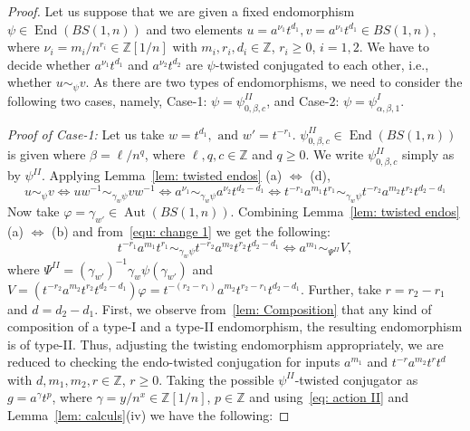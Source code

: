 \documentclass[a4paper]{amsart}
\theoremstyle{definition}
\newcommand\ZZ{\mathbb{Z}}
\newcommand{\Aut}{\operatorname{Aut}}
\newcommand{\End}{\operatorname{End}}
\begin{document}
\begin{proof}
    Let us suppose that we are given a fixed endomorphism $\psi \in \End (BS(1,n))$ and two elements $u = a^{\nu_1}t^{d_1}, v = a^{\nu_1}t^{d_1} \in BS(1, n)$, where $\nu_i =m_i/n^{r_i}\in \ZZ[1/n]$ with $m_i, r_i, d_i\in \ZZ$, $r_i\geq 0$, $i=1,2$. We have to decide whether $a^{\nu_1}t^{d_1}$ and $a^{\nu_2}t^{d_2}$ are $\psi$-twisted conjugated to each other, i.e., whether $u\sim_\psi v$. As there are two types of endomorphisms, we need to consider the following two cases, namely, Case-1: $\psi = \psi^{II}_{0, \beta, c}$, and Case-2: $\psi = \psi^{I}_{\alpha, \beta, 1}$.

    \noindent
    \textit{Proof of Case-1:} Let us take $w=t^{d_1}, \text{ and } w'=t^{-r_1}$. $\psi^{II}_{0, \beta, c}\in \End(BS(1,n))$ is given where $\beta = \ell/n^q$, where $\ell, q, c \in \ZZ$ and $q \geq 0$. We write $\psi^{II}_{0, \beta, c}$ simply as by $\psi^{II}$. Applying Lemma~\ref{lem: twisted endos} (a) $\Leftrightarrow$ (d), 
    \begin{equation}\label{equ: change 1}
        u \sim_{\psi} v \Leftrightarrow uw^{-1} \sim_{\gamma_w\psi} vw^{-1} \Leftrightarrow a^{\nu_1} \sim_{\gamma_w\psi} a^{\nu_2} t^{d_2 - d_1} \Leftrightarrow t^{-r_1} a^{m_1} t^{r_1}  \sim_{\gamma_w\psi} t^{-r_2} a^{m_2} t^{r_2}t^{d_2 - d_1}
    \end{equation}
   Now take $\varphi = \gamma_{w'} \in \Aut(BS(1,n))$. Combining Lemma~\ref{lem: twisted endos} (a) $\Leftrightarrow$ (b) and from~\eqref{equ: change 1} we get the following:
   \begin{equation}
       t^{-r_1} a^{m_1} t^{r_1}  \sim_{\gamma_w\psi} t^{-r_2} a^{m_2} t^{r_2}t^{d_2 - d_1} \Leftrightarrow a^{m_1} \sim_{\Psi^{II}} V,
   \end{equation}
%
where $\Psi^{II} = (\gamma_{w'})^{-1}\gamma_w\psi (\gamma_{w'})$ and $V = (t^{-r_2} a^{m_2} t^{r_2}t^{d_2 - d_1})\varphi = t^{-(r_2 - r_1)}a^{m_2} t^{r_2 - r_1} t^{d_2 - d_1}$. Further, take $r = r_2 - r_1$ and $d = d_2 - d_1$. First, we observe from~\ref{lem: Composition} that any kind of composition of a type-I and a type-II endomorphism, the resulting endomorphism is of type-II.
Thus, adjusting the twisting endomorphism appropriately, we are reduced to checking the endo-twisted conjugation for inputs $a^{m_1}$ and $t^{-r} a^{m_2} t^r t^d$ with $d, m_1, m_2, r \in \ZZ$, $r \geq 0$. Taking the possible $\psi^{II}$-twisted conjugator as $g = a^{\gamma}t^p$, where $\gamma = y/n^x \in \ZZ[1/n]$, $p \in \ZZ$ and using~\eqref{eq: action II} and Lemma~\ref{lem: calculs}(iv) we have the following:

\end{proof}
\end{document}
